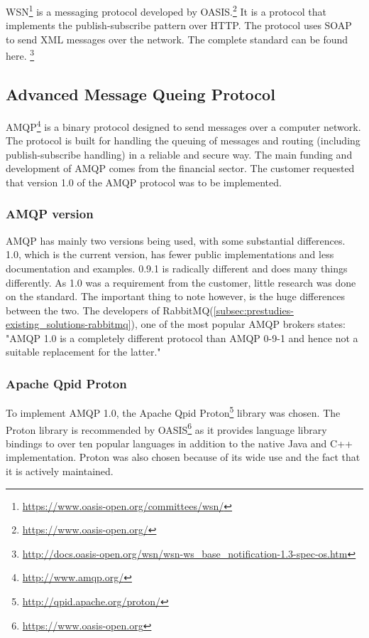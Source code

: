 WSN\footnote{\url{https://www.oasis-open.org/committees/wsn/}} is a messaging protocol developed by OASIS.\footnote{\url{https://www.oasis-open.org/}} It is a protocol that implements the publish-subscribe pattern over HTTP. The protocol uses SOAP to send XML messages over the network. The complete standard can be found here. \footnote{\url{http://docs.oasis-open.org/wsn/wsn-ws_base_notification-1.3-spec-os.htm}}

\subsection{Advanced Message Queing Protocol}
\label{subsec:prestudies-amqp}
AMQP\footnote{\url{http://www.amqp.org/}} is a binary protocol designed to send messages over a computer network. The protocol is built for handling the queuing of messages and routing (including publish-subscribe handling) in a reliable and secure way. The main funding and development of AMQP comes from the financial sector. The customer requested that version 1.0 of the AMQP protocol was to be implemented.

\subsubsection{AMQP version}
\label{subsec:prestudies-amqp-amqp_version}
AMQP has mainly two versions being used, with some substantial differences. 1.0, which is the current version, has fewer public implementations and less documentation and examples. 0.9.1 is radically different and does many things differently. As 1.0 was a requirement from the customer, little research was done on the standard. The important thing to note however, is the huge differences between the two. The developers of RabbitMQ(\ref{subsec:prestudies-existing_solutions-rabbitmq}), one of the most popular AMQP brokers states: "AMQP 1.0 is a completely different protocol than AMQP 0-9-1 and hence not a suitable replacement for the latter."

\subsubsection{Apache Qpid Proton}
To implement AMQP 1.0, the Apache Qpid Proton\footnote{\url{http://qpid.apache.org/proton/}} library was chosen. The Proton library is recommended by OASIS\footnote{\url{https://www.oasis-open.org}} as it provides language library bindings to over ten popular languages in addition to the native Java and C++ implementation. Proton was also chosen because of its wide use and the fact that it is actively maintained.

